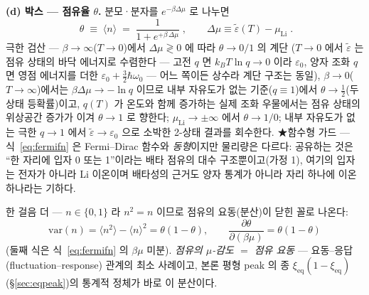 \documentclass[11pt,a4paper]{article}
\newcommand{\eq}{\mathrm{eq}}
\begin{document}
\textbf{(d) 박스 --- 점유율 $\theta$.} 분모·분자를 $e^{-\beta\Delta\mu}$ 로 나누면
\begin{equation}
\boxed{\;\theta\;\equiv\;\langle n\rangle\;=\;\frac{1}{1+e^{+\beta\,\Delta\mu}}\;,
\qquad \Delta\mu\equiv\tilde\varepsilon(T)-\mu_\mathrm{Li}\;.}
\label{eq:fermifn}
\end{equation}
극한 검산 --- $\beta\to\infty$($T\to0$)에서 $\Delta\mu\gtrless0$ 에 따라 $\theta\to0/1$ 의 계단
($T\to0$ 에서 $\tilde\varepsilon$ 는 점유 상태의 바닥 에너지로 수렴한다 --- 고전 $q$ 면 $k_BT\ln q\to0$
이라 $\varepsilon_0$, 양자 조화 $q$ 면 영점 에너지를 더한 $\varepsilon_0+\tfrac32\hbar\omega_0$ --- 어느
쪽이든 상수라 계단 구조는 동일),
$\beta\to0$($T\to\infty$)에서는 $\beta\Delta\mu\to-\ln q$ 이므로 내부 자유도가 없는 기준($q\equiv1$)에서
$\theta\to\tfrac12$(두 상태 등확률)이고, $q(T)$ 가 온도와 함께 증가하는 실제 조화 우물에서는 점유 상태의
위상공간 증가가 이겨 $\theta\to1$ 로 향한다; $\mu_\mathrm{Li}\to\pm\infty$ 에서
$\theta\to1/0$; 내부 자유도가 없는 극한 $q\to1$ 에서 $\tilde\varepsilon\to\varepsilon_0$ 으로 소박한
2-상태 결과를 회수한다. ★함수형 가드 --- 식~\eqref{eq:fermifn} 은 Fermi--Dirac 함수와 \emph{동형}이지만
물리량은 다르다: 공유하는 것은 ``한 자리에 입자 0 또는 1''이라는 배타 점유의 대수 구조뿐이고(가정 1),
여기의 입자는 전자가 아니라 Li 이온이며 배타성의 근거도 양자 통계가 아니라 자리 하나에 이온 하나라는
기하다.

한 걸음 더 --- $n\in\{0,1\}$ 라 $n^2=n$ 이므로 점유의 요동(분산)이 닫힌 꼴로 나온다:
\begin{equation}
\mathrm{var}(n)=\langle n^2\rangle-\langle n\rangle^2=\theta(1-\theta),
\qquad
\frac{\partial\theta}{\partial(\beta\mu)}=\theta(1-\theta)
\label{eq:sm-flucres}
\end{equation}
(둘째 식은 식~\eqref{eq:fermifn} 의 $\beta\mu$ 미분). \emph{점유의 $\mu$-감도 $=$ 점유 요동} --- 요동--응답
(fluctuation--response) 관계의 최소 사례이고, 본론 평형 peak 의 종 $\xi_\eq(1-\xi_\eq)$(\S\ref{sec:eqpeak})의
통계적 정체가 바로 이 분산이다.
\end{document}
